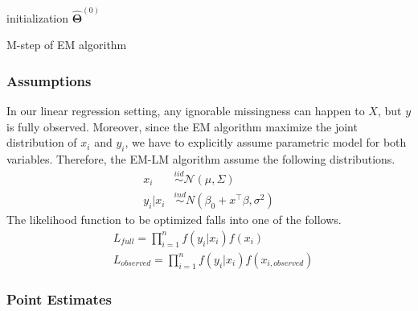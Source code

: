 \documentclass[
  twocolumn]{article}
\begin{document}
\begin{algorithm}
\DontPrintSemicolon
\SetAlgoLined
{}
\BlankLine
initialization $\boldsymbol{\hat{\Theta}}^{(0)}$\;
\caption{M-step of EM algorithm}
\end{algorithm}

\hypertarget{assumptions}{%
\subsubsection{Assumptions}\label{assumptions}}

In our linear regression setting, any ignorable missingness can happen
to \(X\), but \(y\) is fully observed. Moreover, since the EM algorithm
maximize the joint distribution of \(x_i\) and \(y_i\), we have to
explicitly assume parametric model for both variables. Therefore, the
EM-LM algorithm assume the following distributions. \[
\begin{aligned}
x_i &\overset{iid}{\sim} \mathcal{N}(\mu, \Sigma) \\
y_i | x_i &\overset{ind}{\sim} N(\beta_0 + x^{\top}\beta, \sigma^2)
\end{aligned}
\] The likelihood function to be optimized falls into one of the
follows. \[
\begin{aligned}
&L_{full} = \prod_{i = 1}^{n} f(y_i|x_i)f(x_i)\\
&L_{observed} = \prod_{i = 1}^{n} f(y_i|x_i)f(x_{i,observed})
\end{aligned}
\]

\hypertarget{point-estimates}{%
\subsubsection{Point Estimates}\label{point-estimates}}
\end{document}
